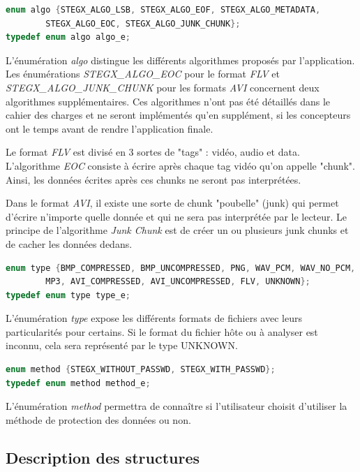 \documentclass[11pt]{article}
\begin{document}
\begin{lstlisting}[language=c]
enum algo {STEGX_ALGO_LSB, STEGX_ALGO_EOF, STEGX_ALGO_METADATA, 
        STEGX_ALGO_EOC, STEGX_ALGO_JUNK_CHUNK};
typedef enum algo algo_e;
\end{lstlisting}

L'énumération \textit{algo} distingue les différents algorithmes proposés par 
l'application. 
Les énumérations \textit{STEGX\_ALGO\_EOC} pour le format \textit{FLV} et
\textit{STEGX\_ALGO\_JUNK\_CHUNK} pour les formats \textit{AVI} concernent 
deux algorithmes supplémentaires. Ces algorithmes n'ont pas été détaillés 
dans le cahier des charges et ne seront implémentés qu'en supplément, si 
les concepteurs ont le temps avant de rendre l'application finale. 

Le format \textit{FLV} est divisé en 3 sortes de "tags" : vidéo, audio et 
data. L'algorithme \textit{EOC} consiste à écrire après chaque tag vidéo 
qu'on appelle "chunk". Ainsi, les données écrites après ces chunks ne seront 
pas interprétées. 

Dans le format \textit{AVI}, il existe une sorte de chunk "poubelle" (junk) 
qui permet d'écrire n'importe quelle donnée et qui ne sera pas interprétée
par le lecteur. Le principe de l'algorithme \textit{Junk Chunk} est de créer 
un ou plusieurs junk chunks et de cacher les données dedans. 
\newline 

\begin{lstlisting}[language=c]
enum type {BMP_COMPRESSED, BMP_UNCOMPRESSED, PNG, WAV_PCM, WAV_NO_PCM, 
        MP3, AVI_COMPRESSED, AVI_UNCOMPRESSED, FLV, UNKNOWN};
typedef enum type type_e;
\end{lstlisting}

L'énumération \textit{type} expose les différents formats de fichiers avec leurs 
particularités pour certains. Si le format du fichier hôte ou à analyser 
est inconnu, cela sera représenté par le type UNKNOWN. \newline


\begin{lstlisting}[language=c]
enum method {STEGX_WITHOUT_PASSWD, STEGX_WITH_PASSWD};
typedef enum method method_e;
\end{lstlisting}

L'énumération \textit{method} permettra de connaître si l'utilisateur choisit
d'utiliser la méthode de protection des données ou non. \newline

\subsection{Description des structures}
\end{document}
